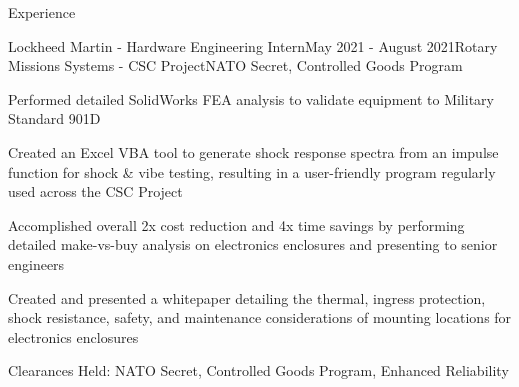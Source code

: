 \documentclass{resume} %
\begin{document}
\begin{rSection}{Experience}

\begin{rSubsection}{Lockheed Martin - Hardware Engineering Intern}{May 2021 - August 2021}{Rotary Missions Systems - CSC Project}{NATO Secret, Controlled Goods Program}

\item Performed detailed SolidWorks FEA analysis to validate equipment to Military Standard 901D
\item Created an Excel VBA tool to generate shock response spectra from an impulse function for shock \& vibe testing, resulting in a user-friendly program regularly used across the CSC Project
\item Accomplished overall 2x cost reduction and 4x time savings by performing detailed make-vs-buy analysis on electronics enclosures and presenting to senior engineers
\item Created and presented a whitepaper detailing the thermal, ingress protection, shock resistance, safety, and maintenance considerations of mounting locations for electronics enclosures
\item Clearances Held: NATO Secret, Controlled Goods Program, Enhanced Reliability

\end{rSubsection}

\begin{comment}
\begin{rSubsection}{Queen's Rocket Engineering Team - Propulsion Engineer}{September 2021 - Present}{Propulsion and Payload Sub-team}{}

\item Responsible for numerical modeling and simulation of a Hybrid 3.5kN rocket engine using Python, NumPy, and SciPy, to measure performance metrics such as specific impulse and fuel regression rate
\item Collaborated on the design and manufacturing of a Plumbing and Electronic Data Acquisition System for a hybrid propulsion test stand
\item Created safety documentation and SOPs in \LaTeX\ for static hot-fires and launch, complete with hazard assessment, nitrous oxide safety, P\&ID diagrams, and contingency planning

\end{rSubsection}

\begin{rSubsection}{Department of National Defense - Engineering Intern}{May 2020 - September 2020}{}{}

\item Documented and presented key specifications on armored patrol vehicles for 411 vehicles in 69 variants
\item Reworked procurement documents based on technical requirements from multiple military bases
\item Proofread english-to-french translations of contracts to ensure correctness

\end{rSubsection}
\end{comment}
\end{rSection}
\end{document}
